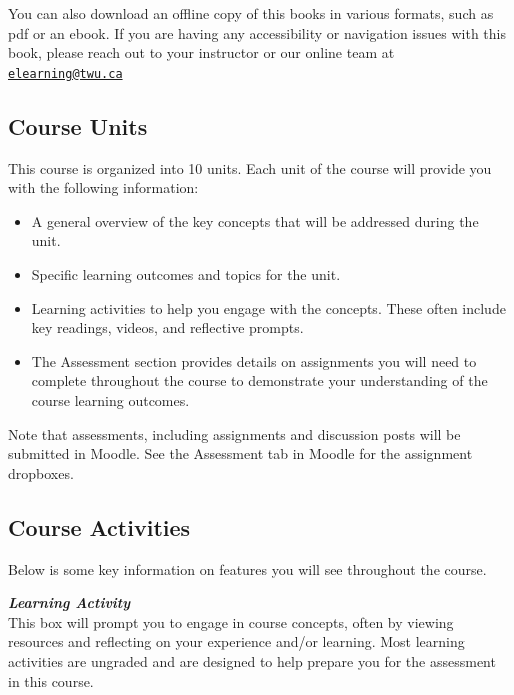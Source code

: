 \documentclass[
]{book}
\providecommand{\tightlist}{%
  \setlength{\itemsep}{0pt}\setlength{\parskip}{0pt}}
\begin{document}
You can also download an offline copy of this books in various formats, such as pdf or an ebook. If you are having any accessibility or navigation issues with this book, please reach out to your instructor or our online team at \href{mailto:elearning@twu.ca}{\nolinkurl{elearning@twu.ca}}

\hypertarget{course-units}{%
\subsection*{Course Units}\label{course-units}}

This course is organized into 10 units. Each unit of the course will provide you with the following information:

\begin{itemize}
\tightlist
\item
  A general overview of the key concepts that will be addressed during the unit.\\
\item
  Specific learning outcomes and topics for the unit.\\
\item
  Learning activities to help you engage with the concepts. These often include key readings, videos, and reflective prompts.\\
\item
  The Assessment section provides details on assignments you will need to complete throughout the course to demonstrate your understanding of the course learning outcomes.
\end{itemize}

\begin{caution}
Note that assessments, including assignments and discussion posts will be submitted in Moodle. See the Assessment tab in Moodle for the assignment dropboxes.
\end{caution}

\hypertarget{course-activities}{%
\subsection*{Course Activities}\label{course-activities}}

Below is some key information on features you will see throughout the course.~

\begin{reflect}
\textbf{\emph{Learning Activity}}\\
This box will prompt you to engage in course concepts, often by viewing resources and reflecting on your experience and/or learning. Most learning activities are ungraded and are designed to help prepare you for the assessment in this course.
\end{reflect}
\end{document}
